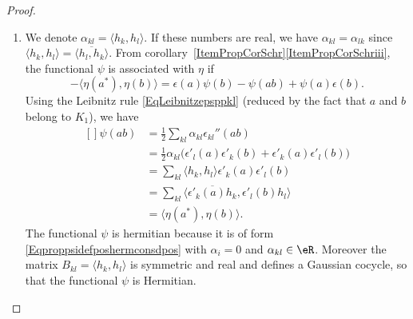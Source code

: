 \begin{proof}
    \begin{enumerate}
        \item
            We denote $\alpha_{kl}=\langle h_k, h_l\rangle $. If these numbers are real, we have $\alpha_{kl}=\alpha_{lk}$ since $\langle h_k, h_l\rangle =\overline{ \langle h_l, h_k\rangle  }$. From corollary~\ref{ItemPropCorSchr}\ref{ItemPropCorSchriii}, the functional $\psi$ is associated with $\eta$ if
            \begin{equation}
                -\langle \eta(a^*), \eta(b)\rangle =\epsilon(a)\psi(b)-\psi(ab)+\psi(a)\epsilon(b).
            \end{equation}
            Using the Leibnitz rule \eqref{EqLeibnitzepsppkl} (reduced by the fact that $a$ and $b$ belong to $K_1$), we have
            \begin{equation}
                \begin{aligned}[]
                    \psi(ab)&=\frac{ 1 }{2}\sum_{kl}\alpha_{kl}\epsilon_{kl}''(ab)\\
                    &=\frac{ 1 }{2}\alpha_{kl}\big( \epsilon'_l(a)\epsilon'_k(b)+\epsilon'_k(a)\epsilon'_l(b) \big)\\
                    &=\sum_{kl}\langle h_k, h_l\rangle \epsilon'_k(a)\epsilon'_l(b)\\
                    &=\sum_{kl}\langle \overline{ \epsilon'_k(a)h_k }, \epsilon'_l(b)h_l\rangle \\
                    &=\langle \eta(a^*), \eta(b)\rangle .
                \end{aligned}
            \end{equation}
            The functional $\psi$ is hermitian because it is of form \eqref{Eqproppsidefposhermconsdpos} with $\alpha_i=0$ and $\alpha_{kl}\in\eR$. Moreover the matrix $B_{kl}=\langle h_k, h_l\rangle $ is symmetric and real and defines a Gaussian cocycle, so that the functional $\psi$ is Hermitian.


\end{enumerate}
\end{proof}
